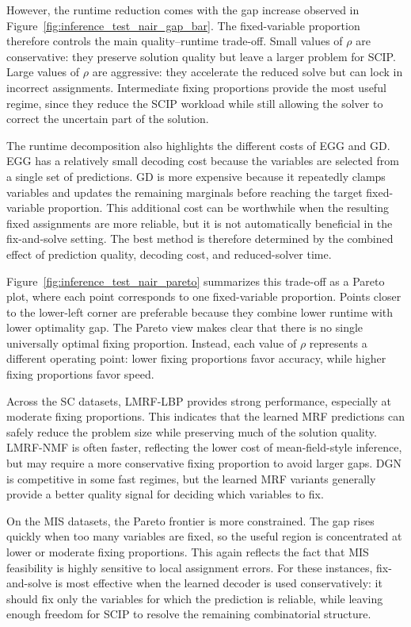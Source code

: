 However, the runtime reduction comes with the gap increase observed in Figure~\ref{fig:inference_test_nair_gap_bar}. The fixed-variable proportion therefore controls the main quality--runtime trade-off. Small values of $\rho$ are conservative: they preserve solution quality but leave a larger problem for SCIP. Large values of $\rho$ are aggressive: they accelerate the reduced solve but can lock in incorrect assignments. Intermediate fixing proportions provide the most useful regime, since they reduce the SCIP workload while still allowing the solver to correct the uncertain part of the solution.

The runtime decomposition also highlights the different costs of EGG and GD. EGG has a relatively small decoding cost because the variables are selected from a single set of predictions. GD is more expensive because it repeatedly clamps variables and updates the remaining marginals before reaching the target fixed-variable proportion. This additional cost can be worthwhile when the resulting fixed assignments are more reliable, but it is not automatically beneficial in the fix-and-solve setting. The best method is therefore determined by the combined effect of prediction quality, decoding cost, and reduced-solver time.



Figure~\ref{fig:inference_test_nair_pareto} summarizes this trade-off as a Pareto plot, where each point corresponds to one fixed-variable proportion. Points closer to the lower-left corner are preferable because they combine lower runtime with lower optimality gap. The Pareto view makes clear that there is no single universally optimal fixing proportion. Instead, each value of $\rho$ represents a different operating point: lower fixing proportions favor accuracy, while higher fixing proportions favor speed.

Across the SC datasets, LMRF-LBP provides strong performance, especially at moderate fixing proportions. This indicates that the learned MRF predictions can safely reduce the problem size while preserving much of the solution quality. LMRF-NMF is often faster, reflecting the lower cost of mean-field-style inference, but may require a more conservative fixing proportion to avoid larger gaps. DGN is competitive in some fast regimes, but the learned MRF variants generally provide a better quality signal for deciding which variables to fix.

On the MIS datasets, the Pareto frontier is more constrained. The gap rises quickly when too many variables are fixed, so the useful region is concentrated at lower or moderate fixing proportions. This again reflects the fact that MIS feasibility is highly sensitive to local assignment errors. For these instances, fix-and-solve is most effective when the learned decoder is used conservatively: it should fix only the variables for which the prediction is reliable, while leaving enough freedom for SCIP to resolve the remaining combinatorial structure.

